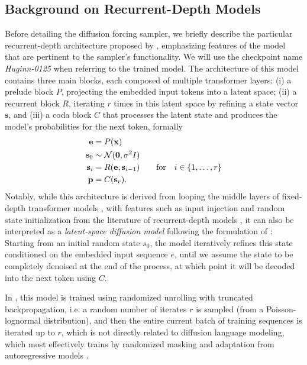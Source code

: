 \documentclass{article} %
\theoremstyle{definition}
\theoremstyle{plain}
\begin{document}
\subsection{Background on Recurrent-Depth Models}
 Before detailing the diffusion forcing sampler, we briefly describe the particular recurrent-depth architecture proposed by \citet{geiping_scaling_2025}, emphasizing features of the model that are pertinent to the sampler's functionality. We will use the checkpoint name \textit{Huginn-0125} when referring to the trained model. The architecture of this model contains three main blocks, each composed of multiple transformer layers: (i) a prelude block $P$, projecting the embedded input tokens into a latent space; (ii) a recurrent block $R$, iterating $r$ times in this latent space by refining a state vector $\textbf{s}$, and (iii) a coda block $C$ that processes the latent state and produces the model's probabilities for the next token, formally 
\begin{align*}
    \mathbf{e} &= P(\mathbf{x}) \\
    \mathbf{s}_0 &\sim \mathcal{N}(\mathbf{0}, \sigma^2 I) \\
    \mathbf{s}_i &= R(\mathbf{e}, \mathbf{s}_{i-1}) \qquad \textnormal{for} \quad i \in \lbrace 1, \dots, r \rbrace \\
    \mathbf{p} &= C(\mathbf{s}_r).
\end{align*}
Notably, while this architecture is derived from looping the middle layers of fixed-depth transformer models \citep{skean_does_2024,sun_transformer_2024,kaplan_tokens_2024}, with features such as input injection and random state initialization from the literature of recurrent-depth models \citep{bansal_end--end_2022,anil_path_2022}, it can also be interpreted as a \textit{latent-space diffusion model} following the formulation of \citet{rombach_high-resolution_2022}: Starting from an initial random state $s_0$, the model iteratively refines this state conditioned on the embedded input sequence $e$, until we assume the state to be completely denoised at the end of the process, at which point it will be decoded into the next token using $C$.

In \citet{geiping_scaling_2025}, this model is trained using randomized unrolling with truncated backpropagation, i.e. a random number of iterates $r$ is sampled (from a Poisson-lognormal distribution), and then the entire current batch of training sequences is iterated up to $r$, which is not directly related to diffusion language modeling, which most effectively trains by randomized masking and adaptation from autoregressive models \citep{nie_large_2025,xie_dream-coder_2025,ye_dream_2025,gong_scaling_2025}.
\end{document}
